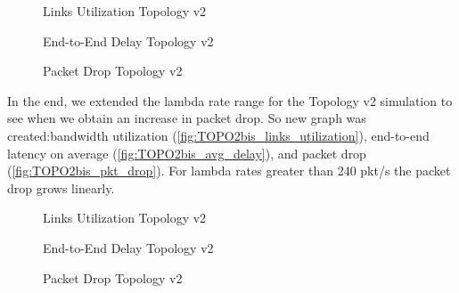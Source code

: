 \documentclass{article}
\begin{document}
\begin{figure}[H]
    \centering
    
    \caption{Links Utilization Topology v2}
    \label{fig:TOPO2_links_utilization}
\end{figure}
\begin{figure}[H]
    \centering
    
    \caption{End-to-End Delay Topology v2}
    \label{fig:TOPO2_avg_delay}
\end{figure}
\begin{figure}[H]
    \centering
    
    \caption{Packet Drop Topology v2}
    \label{fig:TOPO2_pkt_drop}
\end{figure}

\noindent In the end, we extended the lambda rate range for the Topology v2 simulation to see when we obtain an increase in packet drop. So new graph was created:bandwidth utilization (\autoref{fig:TOPO2bis_links_utilization}), end-to-end latency on average (\autoref{fig:TOPO2bis_avg_delay}), and packet drop (\autoref{fig:TOPO2bis_pkt_drop}). For lambda rates greater than 240 pkt/s the packet drop grows linearly.

\begin{figure}[H]
    \centering
    
    \caption{Links Utilization Topology v2}
    \label{fig:TOPO2bis_links_utilization}
\end{figure}
\begin{figure}[H]
    \centering
    
    \caption{End-to-End Delay Topology v2}
    \label{fig:TOPO2bis_avg_delay}
\end{figure}
\begin{figure}[H]
    \centering
    
    \caption{Packet Drop Topology v2}
    \label{fig:TOPO2bis_pkt_drop}
\end{figure}

\newpage
\printbibliography[heading=bibintoc]
\end{document}
